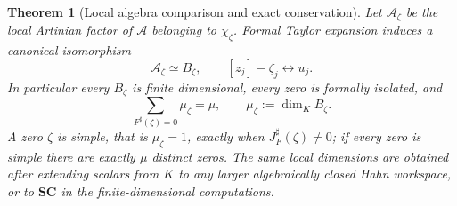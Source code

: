 \documentclass[11pt,letterpaper]{article}
\newtheorem{theorem}{Theorem}[section]
\theoremstyle{definition}
\theoremstyle{remark}
\newcommand{\SC}{\mathbf{SC}}
\newcommand{\Alg}{\mathcal A}
\newcommand{\sh}{^{\sharp}}
\numberwithin{equation}{section}
\begin{document}
\begin{theorem}[Local algebra comparison and exact conservation]
\label{finite:thm:length}
Let $\Alg_\zeta$ be the local Artinian factor of $\Alg$ belonging to $\chi_\zeta$. Formal Taylor expansion induces a canonical isomorphism
\begin{equation}\label{finite:eq:localiso}
 \Alg_\zeta\simeq B_\zeta,
 \qquad
 [z_j]-\zeta_j\longleftrightarrow u_j .
\end{equation}
In particular every $B_\zeta$ is finite dimensional, every zero is formally isolated, and
\begin{equation}\label{finite:eq:conservation}
 \sum_{F\sh(\zeta)=0}\mu_\zeta=\mu,
 \qquad \mu_\zeta:=\dim_KB_\zeta .
\end{equation}
A zero $\zeta$ is \emph{simple}, that is $\mu_\zeta=1$, exactly when $J_F\sh(\zeta)\neq0$; if \emph{every} zero is simple there are exactly $\mu$ distinct zeros. The same local dimensions are obtained after extending scalars from $K$ to any larger algebraically closed Hahn workspace, or to $\SC$ in the finite-dimensional computations.
\end{theorem}
\end{document}
